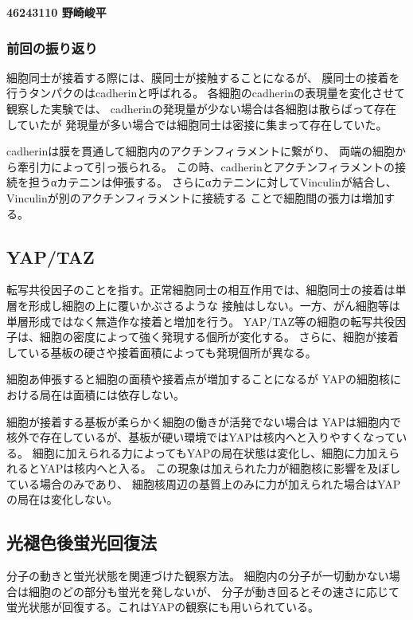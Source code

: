 \documentclass[a4paper,12pt]{ltjsreport}
\begin{document}
\begin{center}
  \textbf{\LARGE{46243110 野崎峻平}}
\end{center}
\subsubsection*{前回の振り返り}
細胞同士が接着する際には、膜同士が接触することになるが、
膜同士の接着を行うタンパクのはcadherinと呼ばれる。
各細胞のcadherinの表現量を変化させて観察した実験では、
cadherinの発現量が少ない場合は各細胞は散らばって存在していたが
発現量が多い場合では細胞同士は密接に集まって存在していた。\par
cadherinは膜を貫通して細胞内のアクチンフィラメントに繋がり、
両端の細胞から牽引力によって引っ張られる。
この時、cadherinとアクチンフィラメントの接続を担うαカテニンは伸張する。
さらにαカテニンに対してVinculinが結合し、Vinculinが別のアクチンフィラメントに接続する
ことで細胞間の張力は増加する。
\subsection*{YAP/TAZ}
転写共役因子のことを指す。正常細胞同士の相互作用では、細胞同士の接着は単層を形成し細胞の上に覆いかぶさるような
接触はしない。一方、がん細胞等は単層形成ではなく無造作な接着と増加を行う。
YAP/TAZ等の細胞の転写共役因子は、細胞の密度によって強く発現する個所が変化する。
さらに、細胞が接着している基板の硬さや接着面積によっても発現個所が異なる。\par
細胞あ伸張すると細胞の面積や接着点が増加することになるが
YAPの細胞核における局在は面積には依存しない。\par
細胞が接着する基板が柔らかく細胞の働きが活発でない場合は
YAPは細胞内で核外で存在しているが、基板が硬い環境ではYAPは核内へと入りやすくなっている。
細胞に加えられる力によってもYAPの局在状態は変化し、細胞に力加えられるとYAPは核内へと入る。
この現象は加えられた力が細胞核に影響を及ぼしている場合のみであり、
細胞核周辺の基質上のみに力が加えられた場合はYAPの局在は変化しない。
\subsection*{光褪色後蛍光回復法}
分子の動きと蛍光状態を関連づけた観察方法。
細胞内の分子が一切動かない場合は細胞のどの部分も蛍光を発しないが、
分子が動き回るとその速さに応じて蛍光状態が回復する。これはYAPの観察にも用いられている。
\end{document}
